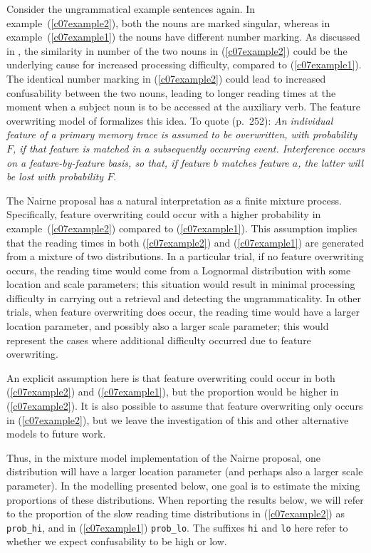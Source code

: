 \documentclass{cambridge7A}\usepackage[]{graphicx}\usepackage[]{color}
\begin{document}
Consider the ungrammatical example sentences again. In example~(\ref{c07example2}),
both the nouns are marked singular, whereas in example~(\ref{c07example1}) the nouns have different number marking. 
As discussed in \cite{VillataFranck},
the similarity in number of the two nouns in (\ref{c07example2}) could be the underlying cause for increased processing difficulty, compared to (\ref{c07example1}).
The identical number marking in (\ref{c07example2}) could lead to increased confusability between the two nouns, leading to longer reading times at the moment when a subject noun is to be accessed at the auxiliary verb. 
The feature overwriting model of \cite{Nairne1990} formalizes this idea. To quote (p.\ 252):
\textit{An individual feature of a primary memory trace is assumed to be overwritten, with probability $F$, if that feature is matched in a subsequently occurring event. Interference occurs on a feature-by-feature basis, so that, if feature $b$ matches feature $a$, the latter will be lost with probability $F$}.

The Nairne proposal has a natural interpretation as a finite mixture process. Specifically,  feature overwriting could occur with a higher probability in example~(\ref{c07example2}) compared to (\ref{c07example1}). This assumption implies that the reading times in both (\ref{c07example2}) and (\ref{c07example1}) are generated from a mixture of two distributions. 
In a particular trial, if no feature overwriting occurs, the reading time would come from a Lognormal distribution with some location and scale parameters; this situation would result in 
minimal processing difficulty in  carrying out a retrieval and detecting the ungrammaticality. In other trials,
when feature overwriting does occur, 
the reading time would have a larger location parameter, and possibly also a larger scale parameter; this would represent the cases where additional difficulty occurred due to feature overwriting. 

An explicit assumption here is that feature overwriting could occur in both (\ref{c07example2}) and (\ref{c07example1}), but the proportion would be higher in (\ref{c07example2}). It is also possible to assume that feature overwriting only occurs in 
(\ref{c07example2}), but we leave the investigation of this and other alternative models to future work. 

Thus, in the mixture model implementation of the Nairne proposal, one distribution will have a larger location parameter (and perhaps also a larger scale parameter).
In the modelling presented below, one goal is to estimate the mixing proportions of these distributions.
When reporting the results below, we will refer to the proportion of the slow reading time distributions in (\ref{c07example2}) as \texttt{prob\_hi}, and in (\ref{c07example1}) \texttt{prob\_lo}. The suffixes \texttt{hi} and \texttt{lo} here refer to whether we expect confusability to be high or low.
\end{document}
